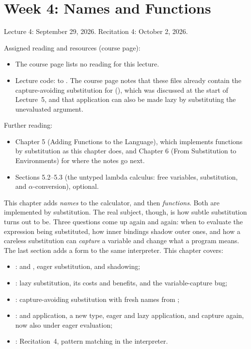\chapter{Week 4: Names and Functions}
\label{ch:week4}

Lecture 4: September 29, 2026. Recitation 4: October 2, 2026.

Assigned reading and resources (course page):
\begin{itemize}
  \item The course page lists no reading for this lecture.
  \item Lecture code:  to . The course page notes that these files already contain the capture-avoiding substitution for  (), which was discussed at the start of Lecture~5, and that application can also be made lazy by substituting the unevaluated argument.
\end{itemize}

Further reading:
\begin{itemize}
  \item \cite{PLAI} Chapter 5 (Adding Functions to the Language), which implements functions by substitution as this chapter does, and Chapter 6 (From Substitution to Environments) for where the notes go next.
  \item \cite{TAPL} Sections 5.2--5.3 (the untyped lambda calculus: free variables, substitution, and $\alpha$-conversion), optional.
\end{itemize}

This chapter adds \emph{names} to the calculator, and then \emph{functions}. Both are implemented by substitution. The real subject, though, is how subtle substitution turns out to be. Three questions come up again and again: when to evaluate the expression being substituted, how inner bindings shadow outer ones, and how a careless substitution can \emph{capture} a variable and change what a program means. The last section adds a  form to the same interpreter. This chapter covers:
\begin{itemize}
  \item {}:  and , eager substitution, and shadowing;
  \item {}: lazy substitution, its costs and benefits, and the variable-capture bug;
  \item {}: capture-avoiding substitution with fresh names from ;
  \item {}:  and application, a new  type, eager and lazy application, and capture again, now also under eager evaluation;
  \item {}: Recitation~4, pattern matching in the interpreter.
\end{itemize}







